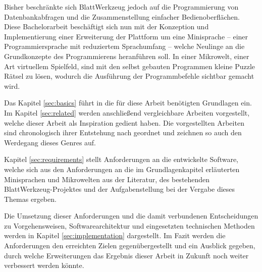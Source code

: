 Bisher beschränkte sich BlattWerkzeug jedoch auf die Programmierung von Datenbankabfragen und die Zusammenstellung einfacher Bedienoberflächen. Diese Bachelorarbeit beschäftigt sich nun mit der Konzeption und Implementierung einer Erweiterung der Plattform um eine Minisprache -- einer Programmiersprache mit reduziertem Sprachumfang -- welche Neulinge an die Grundkonzepte des Programmierens heranführen soll. In einer Mikrowelt, einer Art virtuellem Spielfeld, sind mit den selbst gebauten Programmen kleine Puzzle Rätsel zu lösen, wodurch die Ausführung der Programmbefehle sichtbar gemacht wird.

Das Kapitel \ref{sec:basics} führt in die für diese Arbeit benötigten Grundlagen ein. Im Kapitel \ref{sec:related} werden anschließend vergleichbare Arbeiten vorgestellt, welche dieser Arbeit als Inspiration gedient haben. Die vorgestellten Arbeiten sind chronologisch ihrer Entstehung nach geordnet und zeichnen so auch den Werdegang dieses Genres auf.

Kapitel \ref{sec:requirements} stellt Anforderungen an die entwickelte Software, welche sich aus den Anforderungen an die im Grundlagenkapitel erläuterten Minisprachen und Mikrowelten aus der Literatur, des bestehenden BlattWerkzeug-Projektes und der Aufgabenstellung bei der Vergabe dieses Themas ergeben.

Die Umsetzung dieser Anforderungen und die damit verbundenen Entscheidungen zu Vorgehensweisen, Softwarearchitektur und eingesetzten technischen Methoden werden in Kapitel \ref{sec:implementation} dargestellt. Im Fazit werden die Anforderungen den erreichten Zielen gegenübergestellt und ein Ausblick gegeben, durch welche Erweiterungen das Ergebnis dieser Arbeit in Zukunft noch weiter verbessert werden könnte.


